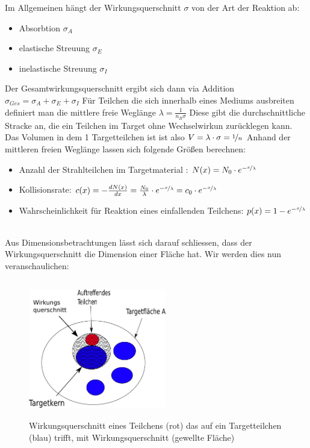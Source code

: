 \documentclass[Ex4_Zusammenfassung.tex]{subfiles}
\begin{document}
Im Allgemeinen hängt der Wirkungsquerschnitt  $ \sigma $ von der Art der Reaktion ab: 
\begin{itemize}
\item Absorbtion $ \sigma_{A} $
\item elastische Streuung $ \sigma_{E} $
\item inelastische Streuung $ \sigma_{I} $
\end{itemize}
Der Gesamtwirkungsquerschnitt ergibt sich dann via Addition $ \sigma_{Ges} = \sigma_{A} + \sigma_{E} + \sigma_{I}  $ \newline
Für Teilchen die sich innerhalb eines Mediums ausbreiten definiert man die mittlere freie Weglänge $ \lambda = \frac{1}{n_B \sigma}$ \newline
Diese gibt die durchschnittliche Stracke an, die ein Teilchen im Target ohne Wechselwirkun zurücklegen kann. \newpage
Das Volumen in dem 1 Targetteilchen ist ist also $ V = \lambda \cdot \sigma = \nicefrac{1}{n} $  \newline
Anhand der mittleren freien Weglänge lassen sich folgende Größen berechnen: 
\begin{itemize}
\item Anzahl der Strahlteilchen im Targetmaterial : $ N(x) = N_{0} \cdot e^{-\nicefrac{x}{\lambda}} $
\item Kollisionsrate: $ c(x) = - \frac{dN(x)}{dx} = \frac{N_{0}}{\lambda} \cdot e^{-\nicefrac{x}{\lambda}} = c_0 \cdot e^{-\nicefrac{x}{\lambda}} $
\item Wahrscheinlichkeit für Reaktion eines einfallenden Teilchens: $  p(x) = 1- e^{-\nicefrac{x}{\lambda}} $
\end{itemize}
\ \\ 
Aus Dimensionsbetrachtungen lässt sich darauf schliessen, dass der Wirkungsquerschnitt die Dimension einer Fläche hat. Wir werden dies nun veranschaulichen: 
\begin{figure}[h]
\includegraphics[height=6cm,width=6cm]{wirkungsquerschnitt.png}
\caption{Wirkungsquerschnitt eines Teilchens (rot) das auf ein Targetteilchen (blau) trifft, mit Wirkungsquerschnitt (gewellte Fläche)}
\end{figure} \newline
\end{document}
